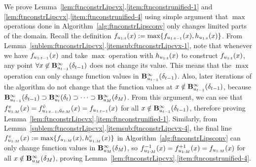 
We prove Lemma~\ref{lem:ftnconstrLipcvx}.\ref{item:ftnconstrunified-1} and \ref{lem:ftnconstrLipcvx}.\ref{item:ftnconstrunified-4} using simple argument 
that $\max$ operations done in Algorithm~\ref{alg:ftnconstrLipsconv} only changes limited parts of the domain.
Recall the definition $f_{u_{1:{t}}}(x) := \max\{f_{u_{1:{t-1}}}(x), h_{u_{1:{t}}}(x)\}$.
From Lemma~\ref{sublem:ftnconstrLipcvx}.\ref{itemsub:ftnconstrLipcvx-1},
note that 
whenever we have $f_{u_{1:{t-1}}}(x)$ and take $\max$ operation with $h_{u_{1:{t}}}(x)$ to construct $f_{u_{1:{t}}}(x)$,
any point $\forall x \not\in \mathbf{B}^\infty_{u_{t-1}}({\delta_{t-1}})$ does not change its value.
This means that the $\max$ operation can only change function values in $\mathbf{B}^\infty_{u_{t-1}}({\delta_{t-1}})$.
Also, later iterations of the algorithm do not change that the function values at $x \notin \mathbf{B}^\infty_{u_{t-1}}({\delta_{t-1}})$, 
because $\mathbf{B}^\infty_{u_{t-1}}({\delta_{t-1}}) \supset \mathbf{B}^\infty_{u_{t}}({\delta_{t}}) \supset \cdots \supset \mathbf{B}^\infty_{u_{M}}({\delta_{M}})$.
From this argument, we can see that $f_{u_{1:M}}^v(x) = f_{u_{1:t-1}, \tilde u_{t:M}}^{\tilde v}(x) = f_{u_{1:{t-1}}}(x)$ for all $x \notin \mathbf{B}^\infty_{u_{t-1}}({\delta_{t-1}})$,
therefore proving Lemma~\ref{lem:ftnconstrLipcvx}.\ref{item:ftnconstrunified-1}. 
Similarly, from Lemma~\ref{sublem:ftnconstrLipcvx}.\ref{itemsub:ftnconstrLipcvx-4}, the final line $f_{u_{1:M}}^v(x) := \max \{ f_{u_{1:{M}}}(x), h^{v}_{u_{1:M}}(x) \}$ in Algorithm~\ref{alg:ftnconstrLipsconv}
can only change function values in $\mathbf{B}^\infty_{u_{M}}({\delta_{M}})$, 
so $f_{u_{1:M}}^{-1}(x) = f_{u_{1:M}}^{+1}(x) = f_{u_{1:{M}}}(x)$ for all  $x \notin \mathbf{B}^\infty_{u_{M}}({\delta_{M}})$, proving Lemma~\ref{lem:ftnconstrLipcvx}.\ref{item:ftnconstrunified-4}.

